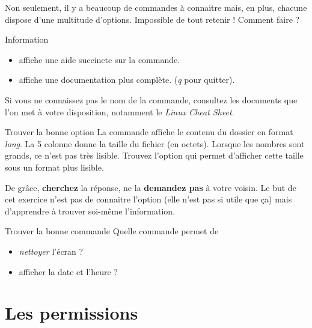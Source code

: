 \documentclass[a4paper,11pt]{style-esi/td}
\begin{document}
		Non seulement, il y a beaucoup de commandes à connaitre mais, en plus, 
		chacune dispose d'une multitude d'options. 
		Impossible de tout retenir ! Comment faire ?   

		\begin{theorie}{Information}
			\begin{itemize}
			\item 
				affiche une aide succincte sur la commande.
			\item 
				 affiche une documentation plus complète.
				(\textit{q} pour quitter).
			\end{itemize}
		\end{theorie}

		Si vous ne connaissez pas le nom de la commande,
		consultez les documents que l'on met à votre disposition,
		notamment le \textit{Linux Cheat Sheet}.  

		\begin{Exercice}{Trouver la bonne option} 
			La commande  
			affiche le contenu du dossier en format \textit{long}.
			La 5\ieme{} colonne donne la taille du fichier (en octets).
			Lorsque les nombres sont grands, ce n'est pas très lisible. 
			Trouvez l'option qui permet d'afficher cette taille sous un format plus lisible.  
			
			\begin{alertbox} 
				De grâce, \textbf{cherchez} la réponse, 
				ne la \textbf{demandez pas} à votre voisin. 
				Le but de cet exercice n'est pas de connaitre l'option 
				(elle n'est pas si utile que \c ca) 
				mais d'apprendre à trouver soi-même l'information.  
			\end{alertbox}
		\end{Exercice}

		\begin{Exercice}{Trouver la bonne commande}
			Quelle commande permet de 
			\begin{itemize}
				\item \textit{nettoyer} l'écran ?  
				\item afficher la date et l'heure ?
			\end{itemize}
		\end{Exercice}

\section{Les permissions}
\end{document}
